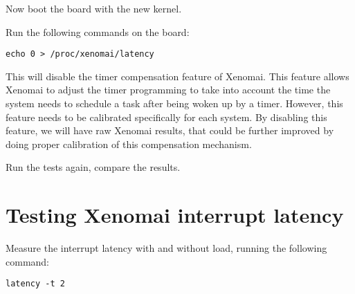 Now boot the board with the new kernel.

Run the following commands on the board:

\begin{verbatim}
echo 0 > /proc/xenomai/latency
\end{verbatim}

This will disable the timer compensation feature of Xenomai. This
feature allows Xenomai to adjust the timer programming to take into
account the time the system needs to schedule a task after being woken
up by a timer. However, this feature needs to be calibrated
specifically for each system. By disabling this feature, we will have
raw Xenomai results, that could be further improved by doing proper
calibration of this compensation mechanism.

Run the tests again, compare the results.

\section{Testing Xenomai interrupt latency}

Measure the interrupt latency with and without load, running the
following command:

\begin{verbatim}
latency -t 2
\end{verbatim}
